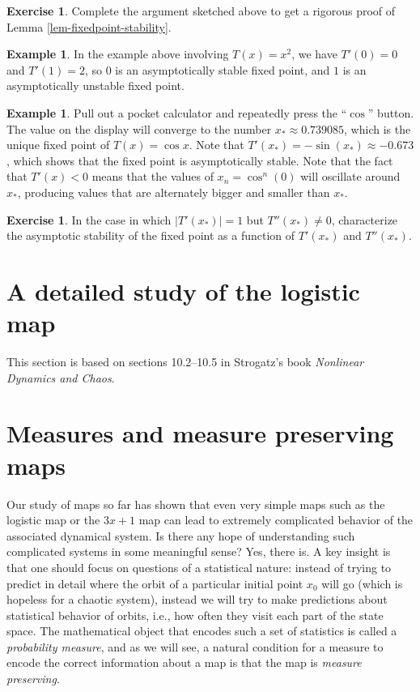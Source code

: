 \documentclass[11pt]{report}
\theoremstyle{plain}
\theoremstyle{definition}
\newtheorem{example}[thm]{Example}
\newtheorem{xexercise}[thm]{Exercise}
\begin{document}
\begin{xexercise}
Complete the argument sketched above to get a
rigorous proof of Lemma \ref{lem-fixedpoint-stability}.
\end{xexercise}

\begin{example}
In the example above involving $T(x)=x^2$, we have
$T'(0)=0$ and $T'(1)=2$, so $0$ is an asymptotically
stable fixed point, and $1$ is an asymptotically
unstable fixed point.
\end{example}

\begin{example}
Pull out a pocket calculator and repeatedly press the
``$\cos$'' button. The value on the display will
converge to the number $x_*\approx0.739085$, which is
the unique fixed point of $T(x)=\cos x$. Note that
$T'(x_*)=-\sin(x_*)\approx -0.673$, which shows that
the fixed point is asymptotically stable. Note that
the fact that $T'(x)<0$ means that the values of
$x_n=\cos^n(0)$ will oscillate around $x_*$,
producing values that are alternately bigger and
smaller than $x_*$.
\end{example}

\begin{xexercise}
In the case in which $|T'(x_*)|=1$ but
$T''(x_*)\neq 0$, characterize the asymptotic
stability of the fixed point as a function of
$T'(x_*)$ and $T''(x_*)$.
\end{xexercise}

\section{A detailed study of the logistic map}
This section is based on sections 10.2--10.5 in
Strogatz's book \emph{Nonlinear Dynamics and Chaos}.

\section{Measures and measure preserving maps}
Our study of maps so far has shown that even very
simple maps such as the logistic map or the $3x+1$
map can lead to extremely complicated behavior of the
associated dynamical system. Is there any hope of
understanding such complicated systems in some
meaningful sense? Yes, there is. A key insight is that
one should focus on questions of a statistical nature:
instead of trying to predict in detail where the orbit
of a particular initial point $x_0$ will go (which is
hopeless for a chaotic system), instead we will try to
make predictions about statistical behavior of orbits,
i.e., how often they visit each part of the state
space. The mathematical object that encodes such a set
of statistics is called a \emph{probability measure}, and
as we will see, a natural condition for a measure to
encode the correct information about a map is that the
map is \emph{measure preserving}.
\end{document}
